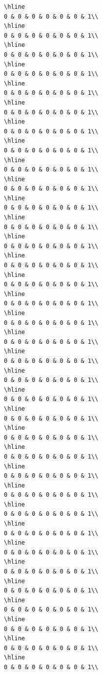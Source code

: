 \documentclass[
]{article}
\begin{document}
\begin{verbatim}
\hline
0 & 0 & 0 & 0 & 0 & 0 & 1\\
\hline
0 & 0 & 0 & 0 & 0 & 0 & 1\\
\hline
0 & 0 & 0 & 0 & 0 & 0 & 1\\
\hline
0 & 0 & 0 & 0 & 0 & 0 & 1\\
\hline
0 & 0 & 0 & 0 & 0 & 0 & 1\\
\hline
0 & 0 & 0 & 0 & 0 & 0 & 1\\
\hline
0 & 0 & 0 & 0 & 0 & 0 & 1\\
\hline
0 & 0 & 0 & 0 & 0 & 0 & 1\\
\hline
0 & 0 & 0 & 0 & 0 & 0 & 1\\
\hline
0 & 0 & 0 & 0 & 0 & 0 & 1\\
\hline
0 & 0 & 0 & 0 & 0 & 0 & 1\\
\hline
0 & 0 & 0 & 0 & 0 & 0 & 1\\
\hline
0 & 0 & 0 & 0 & 0 & 0 & 1\\
\hline
0 & 0 & 0 & 0 & 0 & 0 & 1\\
\hline
0 & 0 & 0 & 0 & 0 & 0 & 1\\
\hline
0 & 0 & 0 & 0 & 0 & 0 & 1\\
\hline
0 & 0 & 0 & 0 & 0 & 0 & 1\\
\hline
0 & 0 & 0 & 0 & 0 & 0 & 1\\
\hline
0 & 0 & 0 & 0 & 0 & 0 & 1\\
\hline
0 & 0 & 0 & 0 & 0 & 0 & 1\\
\hline
0 & 0 & 0 & 0 & 0 & 0 & 1\\
\hline
0 & 0 & 0 & 0 & 0 & 0 & 1\\
\hline
0 & 0 & 0 & 0 & 0 & 0 & 1\\
\hline
0 & 0 & 0 & 0 & 0 & 0 & 1\\
\hline
0 & 0 & 0 & 0 & 0 & 0 & 1\\
\hline
0 & 0 & 0 & 0 & 0 & 0 & 1\\
\hline
0 & 0 & 0 & 0 & 0 & 0 & 1\\
\hline
0 & 0 & 0 & 0 & 0 & 0 & 1\\
\hline
0 & 0 & 0 & 0 & 0 & 0 & 1\\
\hline
0 & 0 & 0 & 0 & 0 & 0 & 1\\
\hline
0 & 0 & 0 & 0 & 0 & 0 & 1\\
\hline
0 & 0 & 0 & 0 & 0 & 0 & 1\\
\hline
0 & 0 & 0 & 0 & 0 & 0 & 1\\
\hline
0 & 0 & 0 & 0 & 0 & 0 & 1\\
\hline
0 & 0 & 0 & 0 & 0 & 0 & 1\\

\end{verbatim}
\end{document}
